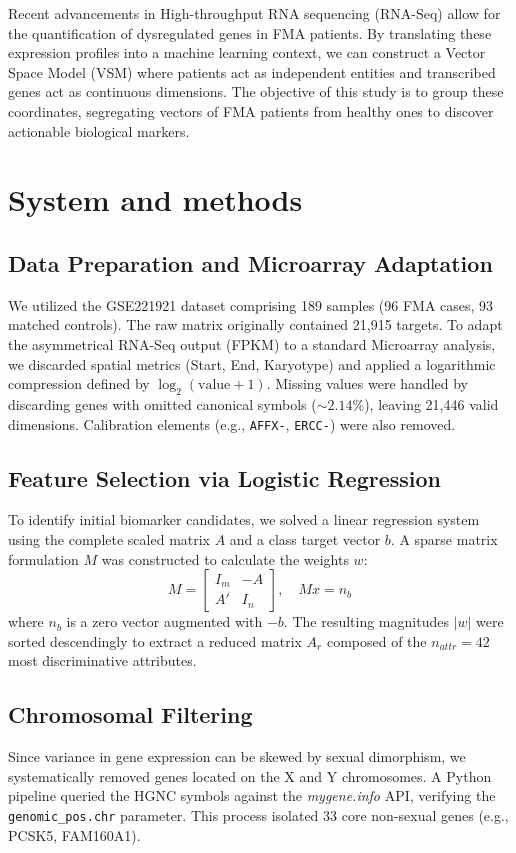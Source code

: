 \documentclass[twocolumn]{article}
\begin{document}
Recent advancements in High-throughput RNA sequencing (RNA-Seq) allow for the quantification of dysregulated genes in FMA patients. By translating these expression profiles into a machine learning context, we can construct a Vector Space Model (VSM) where patients act as independent entities and transcribed genes act as continuous dimensions. The objective of this study is to group these coordinates, segregating vectors of FMA patients from healthy ones to discover actionable biological markers.

\section{System and methods}

\subsection{Data Preparation and Microarray Adaptation}
We utilized the GSE221921 dataset comprising 189 samples (96 FMA cases, 93 matched controls). The raw matrix originally contained 21,915 targets. To adapt the asymmetrical RNA-Seq output (FPKM) to a standard Microarray analysis, we discarded spatial metrics (Start, End, Karyotype) and applied a logarithmic compression defined by $\log_2(\text{value} + 1)$. Missing values were handled by discarding genes with omitted canonical symbols ($\sim2.14\%$), leaving 21,446 valid dimensions. Calibration elements (e.g., \texttt{AFFX-}, \texttt{ERCC-}) were also removed.

\subsection{Feature Selection via Logistic Regression}
To identify initial biomarker candidates, we solved a linear regression system using the complete scaled matrix $A$ and a class target vector $b$. A sparse matrix formulation $M$ was constructed to calculate the weights $w$:
\begin{equation}
M = \begin{bmatrix} I_m & -A \\ A' & I_n \end{bmatrix}, \quad M x = n_b
\end{equation}
where $n_b$ is a zero vector augmented with $-b$. The resulting magnitudes $|w|$ were sorted descendingly to extract a reduced matrix $A_r$ composed of the $n_{attr} = 42$ most discriminative attributes.

\subsection{Chromosomal Filtering}
Since variance in gene expression can be skewed by sexual dimorphism, we systematically removed genes located on the X and Y chromosomes. A Python pipeline queried the HGNC symbols against the \textit{mygene.info} API, verifying the \texttt{genomic\_pos.chr} parameter. This process isolated 33 core non-sexual genes (e.g., PCSK5, FAM160A1).
\end{document}
